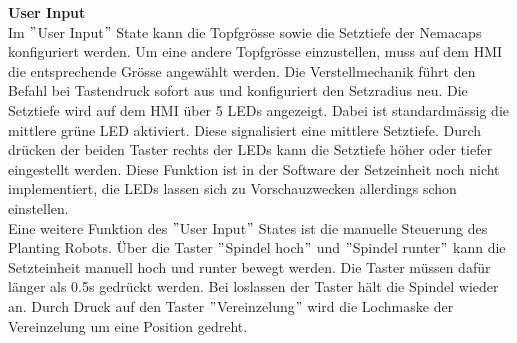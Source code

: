 \textbf{User Input}\\
Im $"$User Input$"$ State kann die Topfgrösse sowie die Setztiefe der Nemacaps konfiguriert werden. Um eine andere Topfgrösse einzustellen, muss auf dem HMI die entsprechende Grösse angewählt werden. Die Verstellmechanik führt den Befahl bei Tastendruck sofort aus und konfiguriert den Setzradius neu. Die Setztiefe wird auf dem HMI über 5 LEDs angezeigt. Dabei ist standardmässig die mittlere grüne LED aktiviert. Diese signalisiert eine mittlere Setztiefe. Durch drücken der beiden Taster rechts der LEDs kann die Setztiefe höher oder tiefer eingestellt werden. Diese Funktion ist in der Software der Setzeinheit noch nicht implementiert, die LEDs lassen sich zu Vorschauzwecken allerdings schon einstellen.\\
Eine weitere Funktion des $"$User Input$"$ States ist die manuelle Steuerung des Planting Robots. Über die Taster $"$Spindel hoch$"$ und $"$Spindel runter$"$ kann die Setzteinheit manuell hoch und runter bewegt werden. Die Taster müssen dafür länger als 0.5s gedrückt werden. Bei loslassen der Taster hält die Spindel wieder an. Durch Druck auf den Taster $"$Vereinzelung$"$ wird die Lochmaske der Vereinzelung um eine Position gedreht.